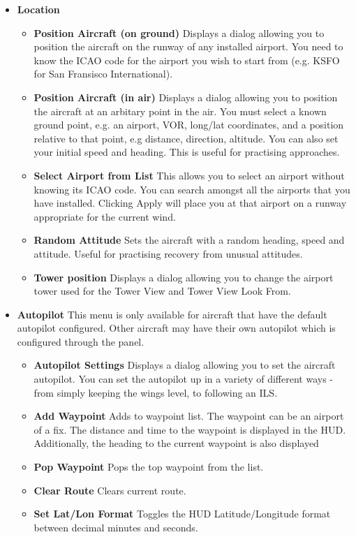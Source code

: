 \begin{itemize}
\item \textbf{Location}
 \begin{itemize}
   \item \textbf{Position Aircraft (on ground)}  Displays a dialog allowing you
to position the aircraft 
   on the runway of any installed airport. You need to know the ICAO code for
the airport you wish to 
   start from (e.g. KSFO for San Fransisco International). 
   \item \textbf{Position Aircraft (in air)} Displays a dialog allowing you to
position the aircraft at 
   an arbitary point in the air. You must select a known ground point, e.g. an
airport, VOR, long/lat 
   coordinates, and a position relative to that point, e.g distance, direction,
altitude. You can also 
   set your initial speed and heading. This is useful for practising approaches.
   \item \textbf{Select Airport from List} This allows you to select an airport
without knowing its ICAO 
   code. You can search amongst all the airports that you have installed.
Clicking Apply will place you 
   at that airport on a runway appropriate for the current wind.
   \item \textbf{Random Attitude} Sets the aircraft with a random heading, speed
and attitude. Useful 
   for practising recovery from unusual attitudes.
   \item \textbf{Tower position} Displays a dialog allowing you to change the
airport tower used for 
   the Tower View and Tower View Look From.
 \end{itemize}

\item \textbf{Autopilot} This menu is only available for
aircraft that have the default 
autopilot configured. Other aircraft may have their own autopilot which is
configured through the panel.
 \begin{itemize}

   \item \textbf{Autopilot Settings} Displays a dialog allowing you to set the
aircraft autopilot. 
   You can set the autopilot up in a variety of different ways - from simply
keeping the wings level, 
   to following an ILS.
  \item \textbf{Add Waypoint} Adds  to waypoint list. The
waypoint can be an airport 
  of a fix. The distance and time to the waypoint is displayed in the HUD.
Additionally, the heading 
  to the current waypoint is also displayed
  \item \textbf{Pop Waypoint} Pops the top waypoint from the list.
 \item \textbf{Clear Route} Clears current route.
  \item \textbf{Set Lat/Lon Format} Toggles the HUD Latitude/Longitude format
between decimal minutes and seconds.
 \end{itemize}
 

\end{itemize}
